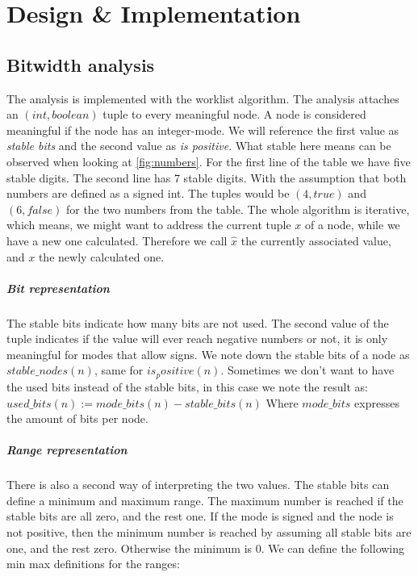 \chapter{Design \& Implementation}\label{sec:impl}

\section{Bitwidth analysis}
The analysis is implemented with the worklist algorithm. The analysis attaches an $(int,boolean)$ tuple to every meaningful node. A node is considered meaningful if the node has an integer-mode. We will reference the first value as \emph{stable bits} and the second value as \emph{is positive}. \newline
What stable here means can be observed when looking at \ref{fig:numbers}.
For the first line of the table we have five stable digits. The second line has 7 stable digits.\newline
With the assumption that both numbers are defined as a signed int. The tuples would be $(4,true)$ and $(6,false)$ for the two numbers from the table.\newline
The whole algorithm is iterative, which means, we might want to address the current tuple $x$ of a node, while we have a new one calculated. Therefore we call $\hat{x}$ the currently associated value, and $x$ the newly calculated one.

\paragraph{Bit representation}
The stable bits indicate how many bits are not used.
The second value of the tuple indicates if the value will ever reach negative numbers or not, it is only meaningful for modes that allow signs. We note down the stable bits of a node as $stable\_nodes(n)$, same for $is_positive(n)$.
Sometimes we don't want to have the used bits instead of the stable bits, in this case we note the result as:$used\_bits(n):=mode\_bits(n)-stable\_bits(n)$
Where $mode\_bits$ expresses the amount of bits per node.

\paragraph{Range representation}
There is also a second way of interpreting the two values. The stable bits can define a minimum and maximum range. The maximum number is reached if the stable bits are all zero, and the rest one. If the mode is signed and the node is not positive, then the minimum number is reached by assuming all stable bits are one, and the rest zero. Otherwise the minimum is 0. We can define the following min max definitions for the ranges:

